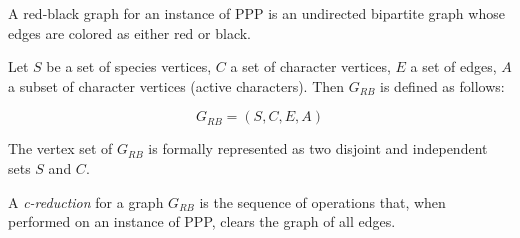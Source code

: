 A red-black graph for an instance of PPP is an undirected bipartite graph whose edges are colored as either red or black.

\begin{Definition}\label{grb}
  Let $S$ be a set of species vertices, $C$ a set of character vertices, $E$ a set of edges, $A$ a subset of character vertices (active characters).
  Then $G_{RB}$ is defined as follows:

  \[ G_{RB} = (S, C, E, A) \]

  The vertex set of $G_{RB}$ is formally represented as two disjoint and independent sets $S$ and $C$.
\end{Definition}


A \textit{c-reduction} for a graph $G_{RB}$ is the sequence of operations that, when performed on an instance of PPP, clears the graph of all edges.
